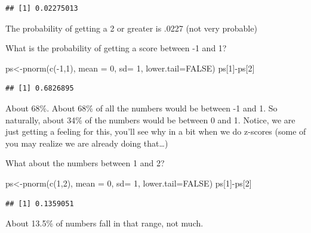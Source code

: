 \documentclass[
]{book}
\newenvironment{Shaded}{\begin{snugshade}}{\end{snugshade}}
\newcommand{\AttributeTok}[1]{\textcolor[rgb]{0.77,0.63,0.00}{#1}}
\newcommand{\ConstantTok}[1]{\textcolor[rgb]{0.00,0.00,0.00}{#1}}
\newcommand{\DecValTok}[1]{\textcolor[rgb]{0.00,0.00,0.81}{#1}}
\newcommand{\FunctionTok}[1]{\textcolor[rgb]{0.00,0.00,0.00}{#1}}
\newcommand{\NormalTok}[1]{#1}
\newcommand{\OtherTok}[1]{\textcolor[rgb]{0.56,0.35,0.01}{#1}}
\newcommand{\SpecialCharTok}[1]{\textcolor[rgb]{0.00,0.00,0.00}{#1}}
\begin{document}
\begin{verbatim}
## [1] 0.02275013
\end{verbatim}

The probability of getting a 2 or greater is .0227 (not very probable)

What is the probability of getting a score between -1 and 1?

\begin{Shaded}
\begin{Highlighting}[]
\NormalTok{ps}\OtherTok{\textless{}{-}}\FunctionTok{pnorm}\NormalTok{(}\FunctionTok{c}\NormalTok{(}\SpecialCharTok{{-}}\DecValTok{1}\NormalTok{,}\DecValTok{1}\NormalTok{), }\AttributeTok{mean =} \DecValTok{0}\NormalTok{, }\AttributeTok{sd=} \DecValTok{1}\NormalTok{, }\AttributeTok{lower.tail=}\ConstantTok{FALSE}\NormalTok{)}
\NormalTok{ps[}\DecValTok{1}\NormalTok{]}\SpecialCharTok{{-}}\NormalTok{ps[}\DecValTok{2}\NormalTok{]}
\end{Highlighting}
\end{Shaded}

\begin{verbatim}
## [1] 0.6826895
\end{verbatim}

About 68\%. About 68\% of all the numbers would be between -1 and 1. So naturally, about 34\% of the numbers would be between 0 and 1. Notice, we are just getting a feeling for this, you'll see why in a bit when we do z-scores (some of you may realize we are already doing that\ldots)

What about the numbers between 1 and 2?

\begin{Shaded}
\begin{Highlighting}[]
\NormalTok{ps}\OtherTok{\textless{}{-}}\FunctionTok{pnorm}\NormalTok{(}\FunctionTok{c}\NormalTok{(}\DecValTok{1}\NormalTok{,}\DecValTok{2}\NormalTok{), }\AttributeTok{mean =} \DecValTok{0}\NormalTok{, }\AttributeTok{sd=} \DecValTok{1}\NormalTok{, }\AttributeTok{lower.tail=}\ConstantTok{FALSE}\NormalTok{)}
\NormalTok{ps[}\DecValTok{1}\NormalTok{]}\SpecialCharTok{{-}}\NormalTok{ps[}\DecValTok{2}\NormalTok{]}
\end{Highlighting}
\end{Shaded}

\begin{verbatim}
## [1] 0.1359051
\end{verbatim}

About 13.5\% of numbers fall in that range, not much.
\end{document}
